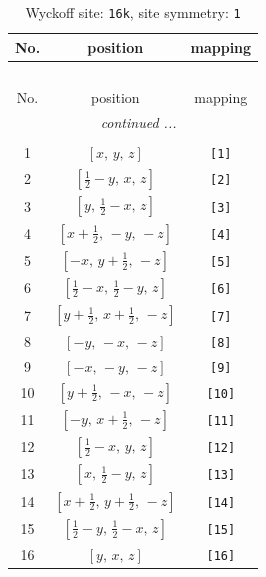 \documentclass[fleqn,8pt]{jsarticle}
\begin{document}
\begin{longtable}{ccc}
\caption{Wyckoff site: {\tt 16k}, site symmetry: {\tt 1}}
 \\
 \hline \hline
No. & position & mapping \\ \hline \endfirsthead

\multicolumn{2}{l}{\tablename\ \thetable{}} \\
 \hline \hline
No. & position & mapping \\ \hline \endhead

 \hline \hline
\multicolumn{2}{r}{\footnotesize\it continued ...} \\ \endfoot

 \hline \hline
\multicolumn{2}{r}{} \\ \endlastfoot

1 & $\left[ x,\, y,\, z \right]$ & {\tt [1]} \\ \hline
2 & $\left[ \frac{1}{2} - y,\, x,\, z \right]$ & {\tt [2]} \\ \hline
3 & $\left[ y,\, \frac{1}{2} - x,\, z \right]$ & {\tt [3]} \\ \hline
4 & $\left[ x + \frac{1}{2},\, - y,\, - z \right]$ & {\tt [4]} \\ \hline
5 & $\left[ - x,\, y + \frac{1}{2},\, - z \right]$ & {\tt [5]} \\ \hline
6 & $\left[ \frac{1}{2} - x,\, \frac{1}{2} - y,\, z \right]$ & {\tt [6]} \\ \hline
7 & $\left[ y + \frac{1}{2},\, x + \frac{1}{2},\, - z \right]$ & {\tt [7]} \\ \hline
8 & $\left[ - y,\, - x,\, - z \right]$ & {\tt [8]} \\ \hline
9 & $\left[ - x,\, - y,\, - z \right]$ & {\tt [9]} \\ \hline
10 & $\left[ y + \frac{1}{2},\, - x,\, - z \right]$ & {\tt [10]} \\ \hline
11 & $\left[ - y,\, x + \frac{1}{2},\, - z \right]$ & {\tt [11]} \\ \hline
12 & $\left[ \frac{1}{2} - x,\, y,\, z \right]$ & {\tt [12]} \\ \hline
13 & $\left[ x,\, \frac{1}{2} - y,\, z \right]$ & {\tt [13]} \\ \hline
14 & $\left[ x + \frac{1}{2},\, y + \frac{1}{2},\, - z \right]$ & {\tt [14]} \\ \hline
15 & $\left[ \frac{1}{2} - y,\, \frac{1}{2} - x,\, z \right]$ & {\tt [15]} \\ \hline
16 & $\left[ y,\, x,\, z \right]$ & {\tt [16]} \\
\end{longtable}
\end{document}
